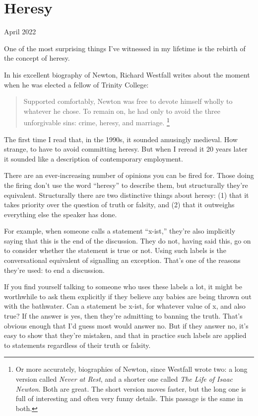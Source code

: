 \chapter{Heresy}

April 2022

One of the most surprising things I've witnessed in my lifetime is the
rebirth of the concept of heresy.

In his excellent biography of Newton, Richard Westfall writes about the
moment when he was elected a fellow of Trinity College:

\begin{quote}
Supported comfortably, Newton was free to devote himself wholly to
whatever he chose. To remain on, he had only to avoid the three
unforgivable sins: crime, heresy, and marriage. \footnote{Or more accurately, biographies of Newton, since Westfall wrote
two: a long version called \emph{Never at Rest}, and a shorter one
called \emph{The Life of Isaac Newton}. Both are great. The short
version moves faster, but the long one is full of interesting and often
very funny details. This passage is the same in both.}
\end{quote}

The first time I read that, in the 1990s, it sounded amusingly medieval.
How strange, to have to avoid committing heresy. But when I reread it 20
years later it sounded like a description of contemporary employment.

There are an ever-increasing number of opinions you can be fired for.
Those doing the firing don't use the word ``heresy'' to describe them,
but structurally they're equivalent. Structurally there are two
distinctive things about heresy: (1) that it takes priority over the
question of truth or falsity, and (2) that it outweighs everything else
the speaker has done.

For example, when someone calls a statement ``x-ist,'' they're also
implicitly saying that this is the end of the discussion. They do not,
having said this, go on to consider whether the statement is true or
not. Using such labels is the conversational equivalent of signalling an
exception. That's one of the reasons they're used: to end a discussion.

If you find yourself talking to someone who uses these labels a lot, it
might be worthwhile to ask them explicitly if they believe any babies
are being thrown out with the bathwater. Can a statement be x-ist, for
whatever value of x, and also true? If the answer is yes, then they're
admitting to banning the truth. That's obvious enough that I'd guess
most would answer no. But if they answer no, it's easy to show that
they're mistaken, and that in practice such labels are applied to
statements regardless of their truth or falsity.

